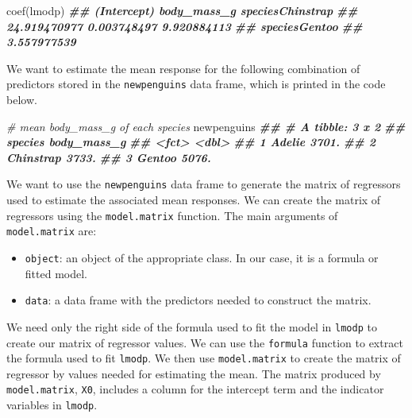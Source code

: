 \documentclass[
]{book}
\newenvironment{Shaded}{\begin{snugshade}}{\end{snugshade}}
\newcommand{\CommentTok}[1]{\textcolor[rgb]{0.56,0.35,0.01}{\textit{#1}}}
\newcommand{\DocumentationTok}[1]{\textcolor[rgb]{0.56,0.35,0.01}{\textbf{\textit{#1}}}}
\newcommand{\FunctionTok}[1]{\textcolor[rgb]{0.00,0.00,0.00}{#1}}
\newcommand{\NormalTok}[1]{#1}
\providecommand{\tightlist}{%
  \setlength{\itemsep}{0pt}\setlength{\parskip}{0pt}}
\theoremstyle{definition}
\theoremstyle{definition}
\theoremstyle{definition}
\theoremstyle{definition}
\theoremstyle{remark}
\begin{document}
\begin{Shaded}
\begin{Highlighting}[]
\FunctionTok{coef}\NormalTok{(lmodp)}
\DocumentationTok{\#\#      (Intercept)      body\_mass\_g speciesChinstrap }
\DocumentationTok{\#\#     24.919470977      0.003748497      9.920884113 }
\DocumentationTok{\#\#    speciesGentoo }
\DocumentationTok{\#\#      3.557977539}
\end{Highlighting}
\end{Shaded}

We want to estimate the mean response for the following combination of predictors stored in the \texttt{newpenguins} data frame, which is printed in the code below.

\begin{Shaded}
\begin{Highlighting}[]
\CommentTok{\# mean body\_mass\_g of each species}
\NormalTok{newpenguins}
\DocumentationTok{\#\# \# A tibble: 3 x 2}
\DocumentationTok{\#\#   species   body\_mass\_g}
\DocumentationTok{\#\#   \textless{}fct\textgreater{}           \textless{}dbl\textgreater{}}
\DocumentationTok{\#\# 1 Adelie          3701.}
\DocumentationTok{\#\# 2 Chinstrap       3733.}
\DocumentationTok{\#\# 3 Gentoo          5076.}
\end{Highlighting}
\end{Shaded}

We want to use the \texttt{newpenguins} data frame to generate the matrix of regressors used to estimate the associated mean responses. We can create the matrix of regressors using the \texttt{model.matrix} function. The main arguments of \texttt{model.matrix} are:

\begin{itemize}
\tightlist
\item
  \texttt{object}: an object of the appropriate class. In our case, it is a formula or fitted model.
\item
  \texttt{data}: a data frame with the predictors needed to construct the matrix.
\end{itemize}

We need only the right side of the formula used to fit the model in \texttt{lmodp} to create our matrix of regressor values. We can use the \texttt{formula} function to extract the formula used to fit \texttt{lmodp}. We then use \texttt{model.matrix} to create the matrix of regressor by values needed for estimating the mean. The matrix produced by \texttt{model.matrix}, \texttt{X0}, includes a column for the intercept term and the indicator variables in \texttt{lmodp}.
\end{document}
